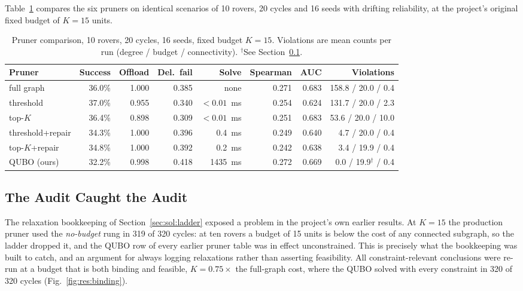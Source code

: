 Table~\ref{tab:res:pruners} compares the six pruners on identical scenarios of
10 rovers, 20 cycles and 16 seeds with drifting reliability, at the project's
original fixed budget of $K=15$ units.

\begin{table}[htbp]
\centering
\caption[Pruner comparison, 10 rovers, 20 cycles, 16 seeds, fixed budget $K=15$.]{Pruner comparison, 10 rovers, 20 cycles, 16 seeds, fixed budget
$K=15$. Violations are mean counts per run (degree / budget / connectivity).
$^{\dagger}$See Section~\ref{sec:res:audit}.}
\label{tab:res:pruners}
\footnotesize
\setlength{\tabcolsep}{4pt}
\begin{tabular}{@{}l r r r r r r r@{}}
\toprule
Pruner & Success & Offload & Del.\ fail & Solve & Spearman & AUC & Violations \\
\midrule
full graph & 36.0\% & 1.000 & 0.385 & none & 0.271 & 0.683 & 158.8 / 20.0 / 0.4 \\
threshold & 37.0\% & 0.955 & 0.340 & $<0.01$~ms & 0.254 & 0.624 & 131.7 / 20.0 / 2.3 \\
top-$K$ & 36.4\% & 0.898 & 0.309 & $<0.01$~ms & 0.251 & 0.683 & 53.6 / 20.0 / 10.0 \\
threshold+repair & 34.3\% & 1.000 & 0.396 & 0.4~ms & 0.249 & 0.640 & 4.7 / 20.0 / 0.4 \\
top-$K$+repair & 34.8\% & 1.000 & 0.392 & 0.2~ms & 0.242 & 0.638 & 3.4 / 19.9 / 0.4 \\
QUBO (ours) & 32.2\% & 0.998 & 0.418 & 1435~ms & 0.272 & 0.669 & 0.0 / 19.9$^{\dagger}$ / 0.4 \\
\bottomrule
\end{tabular}
\end{table}

\subsection{The Audit Caught the Audit}
\label{sec:res:audit}

The relaxation bookkeeping of Section~\ref{sec:sol:ladder} exposed a problem
in the project's own earlier results. At $K=15$ the production pruner used the
\emph{no-budget} rung in 319 of 320 cycles: at ten rovers a budget of 15 units
is below the cost of any connected subgraph, so the ladder dropped it, and the
QUBO row of every earlier pruner table was in effect unconstrained. This is
precisely what the bookkeeping was built to catch, and an argument for always
logging relaxations rather than asserting feasibility. All
constraint-relevant conclusions were re-run at a budget that is both binding
and feasible, $K=0.75\times$ the full-graph cost, where the QUBO solved with
every constraint in 320 of 320 cycles (Fig.~\ref{fig:res:binding}).

